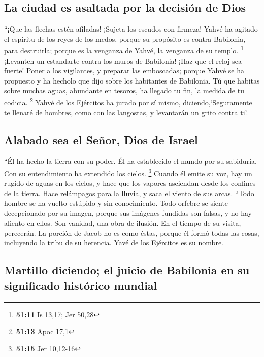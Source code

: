 \hypertarget{la-ciudad-es-asaltada-por-la-decisiuxf3n-de-dios}{%
\subsection{La ciudad es asaltada por la decisión de
Dios}\label{la-ciudad-es-asaltada-por-la-decisiuxf3n-de-dios}}

 ``¡Que las flechas estén afiladas! ¡Sujeta los escudos
con firmeza! Yahvé ha agitado el espíritu de los reyes de los medos,
porque su propósito es contra Babilonia, para destruirla; porque es la
venganza de Yahvé, la venganza de su templo. \footnote{\textbf{51:11} Is
  13,17; Jer 50,28}  ¡Levanten un estandarte contra los
muros de Babilonia! ¡Haz que el reloj sea fuerte! Poner a los
vigilantes, y preparar las emboscadas; porque Yahvé se ha propuesto y ha
hecholo que dijo sobre los habitantes de Babilonia.  Tú
que habitas sobre muchas aguas, abundante en tesoros, ha llegado tu fin,
la medida de tu codicia. \footnote{\textbf{51:13} Apoc 17,1}
 Yahvé de los Ejércitos ha jurado por sí mismo,
diciendo,`Seguramente te llenaré de hombres, como con las langostas, y
levantarán un grito contra ti'.

\hypertarget{alabado-sea-el-seuxf1or-dios-de-israel}{%
\subsection{Alabado sea el Señor, Dios de
Israel}\label{alabado-sea-el-seuxf1or-dios-de-israel}}

 ``Él ha hecho la tierra con su poder. Él ha establecido
el mundo por su sabiduría. Con su entendimiento ha extendido los cielos.
\footnote{\textbf{51:15} Jer 10,12-16}  Cuando él emite
su voz, hay un rugido de aguas en los cielos, y hace que los vapores
asciendan desde los confines de la tierra. Hace relámpagos para la
lluvia, y saca el viento de sus arcas.  ``Todo hombre se
ha vuelto estúpido y sin conocimiento. Todo orfebre se siente
decepcionado por su imagen, porque sus imágenes fundidas son falsas, y
no hay aliento en ellos.  Son vanidad, una obra de
ilusión. En el tiempo de su visita, perecerán.  La
porción de Jacob no es como éstas, porque él formó todas las cosas,
incluyendo la tribu de su herencia. Yavé de los Ejércitos es su nombre.

\hypertarget{martillo-diciendo-el-juicio-de-babilonia-en-su-significado-histuxf3rico-mundial}{%
\subsection{Martillo diciendo; el juicio de Babilonia en su significado
histórico
mundial}\label{martillo-diciendo-el-juicio-de-babilonia-en-su-significado-histuxf3rico-mundial}}

